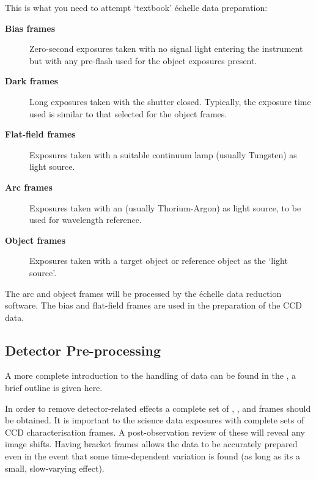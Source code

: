 This is what you need to attempt `textbook' \'{e}chelle
data preparation:

\begin{description}

\item [{\bf Bias frames}]
      Zero-second exposures taken with no signal light entering the
      instrument but with any pre-flash used for the object exposures
      present.

\item [{\bf Dark frames}]
      Long exposures taken with the shutter closed.  Typically, the
      exposure time used is similar to that selected for the object
      frames.

\item [{\bf Flat-field frames}]
      Exposures taken with a suitable continuum lamp
      (usually Tungsten) as light source.

\item [{\bf Arc frames}]
      Exposures taken with an 
      (usually Thorium-Argon) as
      light source, to be used for wavelength reference.

\item [{\bf Object frames}]
      Exposures taken with a target object or reference object as the
      `light source'.

\end{description}

The arc and object frames will be processed by the \'{e}chelle data
reduction software.  The bias and flat-field frames are used in the
preparation of the CCD data.


\subsection{Detector Pre-processing}

A more complete introduction to the handling of 
data can be found in the ,
a brief outline is given here.

In order to remove detector-related effects a complete set of
, ,
and
 frames should be obtained.
It is important to {\em
{}} the science data exposures with
complete sets of CCD
characterisation frames.  A post-observation review of these will reveal
any image shifts.  Having bracket frames allows the data to be
accurately prepared even in the event that some time-dependent variation
is found (as long as its a small, slow-varying effect).

